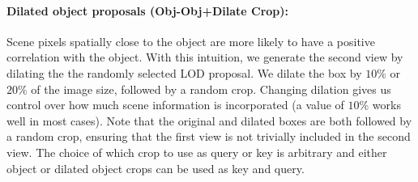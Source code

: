 



\paragraph{Dilated object proposals (Obj-Obj+Dilate Crop):} 
Scene pixels spatially close to the object are more likely to have a positive correlation with the object. With this intuition, we generate the second view by dilating the  the randomly selected LOD proposal. We dilate the box by $10\%$ or $20\%$ of the image size, followed by a random crop. Changing dilation gives us control over how much scene information is incorporated (a value of $10\%$ works well in most cases). Note that the original and dilated boxes are both followed by a random crop, ensuring that the first view is not trivially included in the second view. The choice of which crop to use as query or key is arbitrary and either object or dilated object crops can be used as key and query.  

